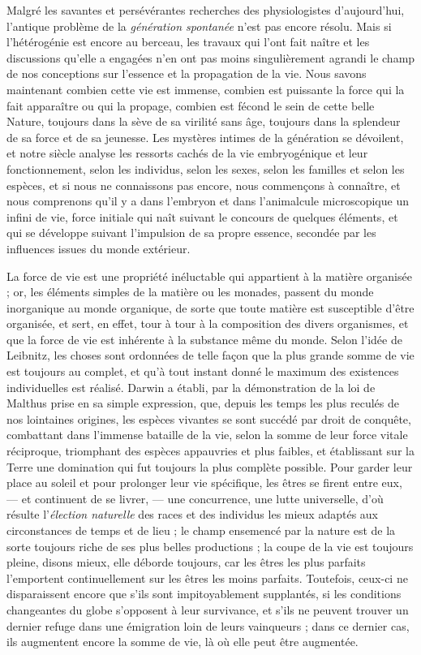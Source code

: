 \documentclass[a4paper, 11pt, oneside, landscape]{article}
\begin{document}
Malgré les savantes et persévérantes recherches des physiologistes d'aujourd'hui, l'antique problème de la \emph{génération spontanée} n'est pas encore résolu. Mais si l'hétérogénie est encore au berceau, les travaux qui l'ont fait naître et les discussions qu'elle a engagées n'en ont pas moins singulièrement agrandi le champ de nos conceptions sur l'essence et la propagation de la vie. Nous savons maintenant combien cette vie est immense, combien est puissante la force qui la fait apparaître ou qui la propage, combien est fécond le sein de cette belle Nature, toujours dans la sève de sa virilité sans âge, toujours dans la splendeur de sa force et de sa jeunesse. Les mystères intimes de la génération se dévoilent, et notre siècle analyse les ressorts cachés de la vie embryogénique et leur fonctionnement, selon les individus, selon les sexes, selon les familles et selon les espèces, et si nous ne connaissons pas encore, nous commençons à connaître, et nous comprenons qu'il y a dans l'embryon et dans l'animalcule microscopique un infini de vie, force initiale qui naît suivant le concours de quelques éléments, et qui se développe suivant l'impulsion de sa propre essence, secondée par les influences issues du monde extérieur.

La force de vie est une propriété inéluctable qui appartient à la matière organisée ; or, les éléments simples de la matière ou les monades, passent du monde inorganique au monde organique, de sorte que toute matière est susceptible d'être organisée, et sert, en effet, tour à tour à la composition des divers organismes, et que la force de vie est inhérente à la substance même du monde. Selon l'idée de Leibnitz, les choses sont ordonnées de telle façon que la plus grande somme de vie est toujours au complet, et qu'à tout instant donné le maximum des existences individuelles est réalisé. Darwin a établi, par la démonstration de la loi de Malthus prise en sa simple expression, que, depuis les temps les plus reculés de nos lointaines origines, les espèces vivantes se sont succédé par droit de conquête, combattant dans l'immense bataille de la vie, selon la somme de leur force vitale réciproque, triomphant des espèces appauvries et plus faibles, et établissant sur la Terre une domination qui fut toujours la plus complète possible. Pour garder leur place au soleil et pour prolonger leur vie spécifique, les êtres se firent entre eux, --- et continuent de se livrer, --- une concurrence, une lutte universelle, d'où résulte l'\emph{élection naturelle} des races et des individus les mieux adaptés aux circonstances de temps et de lieu ; le champ ensemencé par la nature est de la sorte toujours riche de ses plus belles productions ; la coupe de la vie est toujours pleine, disons mieux, elle déborde toujours, car les êtres les plus parfaits l'emportent continuellement sur les êtres les moins parfaits. Toutefois, ceux-ci ne disparaissent encore que s'ils sont impitoyablement supplantés, si les conditions changeantes du globe s'opposent à leur survivance, et s'ils ne peuvent trouver un dernier refuge dans une émigration loin de leurs vainqueurs ; dans ce dernier cas, ils augmentent encore la somme de vie, là où elle peut être augmentée.
\end{document}
